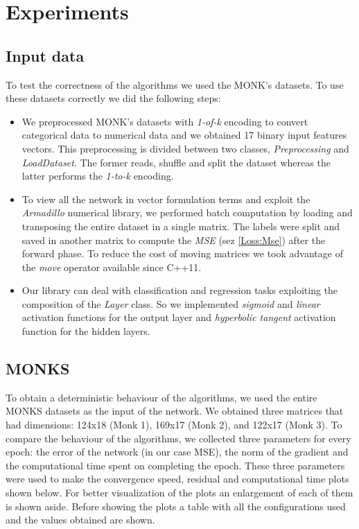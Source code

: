 \section{Experiments}

\subsection{Input data}
To test the correctness of the algorithms we used the MONK's datasets. To use these datasets correctly we did the following steps:
\begin{itemize}
	\item We preprocessed MONK's datasets with \textit{1-of-k} encoding to convert categorical data to numerical data and we obtained 17 binary input features vectors. This preprocessing is divided between two classes, \textit{Preprocessing} and \textit{LoadDataset}. The former reads, shuffle and split the dataset whereas the latter performs the \textit{1-to-k} encoding. 
	\item To view all the network in vector formulation terms and exploit the \textit{Armadillo} numerical library, we performed batch computation by loading and transposing the entire dataset in a single matrix. The labels were split and saved in another matrix to compute the \textit{MSE} (sez \ref{Loss:Mse}) after the forward phase. To reduce the cost of moving matrices we took advantage of the \textit{move} operator available since C++11. 
	\item Our library can deal with classification and regression tasks exploiting the composition of the \textit{Layer} class.  So we implemented \textit{sigmoid} and \textit{linear} activation functions for the output layer and \textit{hyperbolic tangent} activation function for the hidden layers.
\end{itemize}


\subsection{MONKS} 
To obtain a deterministic behaviour of the algorithms, we used the entire MONKS datasets as the input of the network. We obtained three matrices that had dimensions: 124x18 (Monk 1), 169x17 (Monk 2), and 122x17 (Monk 3). To compare the behaviour of the algorithms, we collected three parameters for every epoch: the error of the network (in our case MSE), the norm of the gradient and the computational time spent on completing the epoch. These three parameters were used to make the convergence speed, residual and computational time plots shown below. For better visualization of the plots an enlargement of each of them is shown aside. Before showing the plots a table with all the configurations used and the values obtained are shown.

